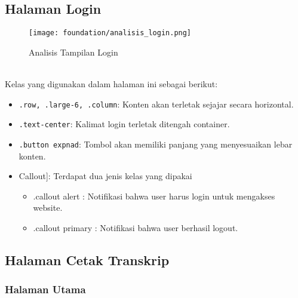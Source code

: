\subsection{Halaman Login}
\begin{figure} [H]
	\centering  
	\texttt{[image: foundation/analisis\_login.png]}  
	\caption{Analisis Tampilan Login} 
\end{figure} \noindent \\
Kelas yang digunakan dalam halaman ini sebagai berikut:
\begin{itemize}
	\item \texttt{.row, .large-6, .column}: Konten akan terletak sejajar secara horizontal.
	\item \texttt{.text-center}: Kalimat login terletak ditengah container.
	\item \texttt{.button expnad}: Tombol akan memiliki panjang yang menyesuaikan lebar konten.
	\item Callout]: Terdapat dua jenis kelas yang dipakai
		\begin{itemize}
			\item.callout alert	: Notifikasi bahwa user harus login untuk mengakses website.
			\item.callout primary	: Notifikasi bahwa user berhasil logout.
		\end{itemize}
		
\end{itemize}

\subsection{Halaman Cetak Transkrip}
\subsubsection{Halaman Utama}

